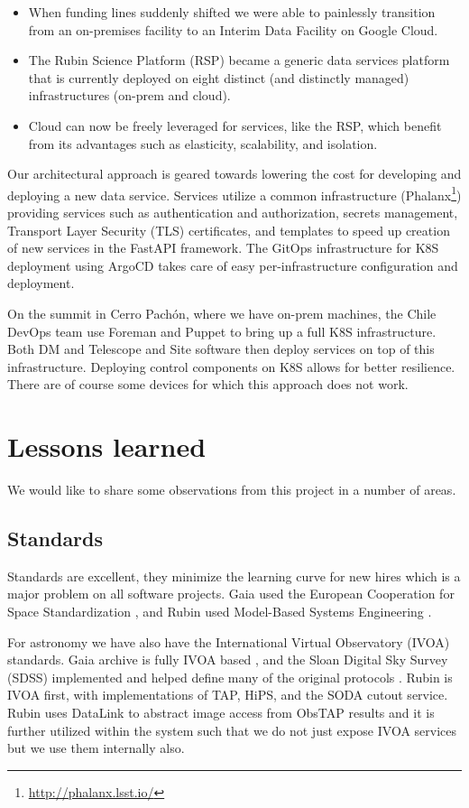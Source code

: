 \documentclass[11pt,twoside]{article}
\begin{document}
\begin{itemize}
\item When funding lines suddenly shifted we were able to painlessly transition from an on-premises facility to an Interim Data Facility on Google Cloud.
\item The Rubin Science Platform (RSP) became a generic data services platform that is currently deployed on eight distinct (and distinctly managed) infrastructures (on-prem and cloud).
\item Cloud can now be freely leveraged for services, like the RSP, which benefit from its advantages such as elasticity, scalability, and isolation.
\end{itemize}

Our architectural approach is geared towards lowering the cost for developing and deploying a new data service.
Services utilize a common infrastructure (Phalanx\footnote{\url{http://phalanx.lsst.io/}}) providing services such as authentication and authorization, secrets management, Transport Layer Security (TLS) certificates, and templates to speed up creation of new services in the FastAPI framework.
The GitOps infrastructure for K8S deployment using ArgoCD takes care of easy per-infrastructure configuration and deployment.

On the summit in Cerro Pach\'{o}n, where we have on-prem machines, the Chile DevOps team use Foreman and Puppet to bring up a full K8S infrastructure.
Both DM and Telescope and Site software then deploy services on top of this infrastructure.
Deploying control components on K8S allows for better resilience.
There are of course some devices for which this approach does not work.


\section{Lessons learned}
We would like to share some observations from this project in a number of areas.
\subsection{Standards}
Standards are excellent, they minimize the learning curve for new hires which is a major problem on all software projects.
Gaia used the European Cooperation for Space Standardization \citep[ECSS;][]{2008ASPC..394..191O}, and
 Rubin used Model-Based Systems Engineering \citep[MBSE;][]{2018SPIE10705E..0US}.

For astronomy we have also have the International Virtual Observatory (IVOA) standards. Gaia archive is fully IVOA based \citep{2019ASPC..523..445S,2015scop.confE...8G}, and the Sloan Digital Sky Survey (SDSS) implemented and helped define many of the original protocols \citep{2005ASPC..347..684T}.
Rubin is IVOA first, with implementations of TAP, HiPS, and the SODA cutout service.
Rubin uses DataLink to abstract image access from ObsTAP results and it is further utilized within the system such that we do not just expose IVOA services but we use them internally also.
\end{document}
